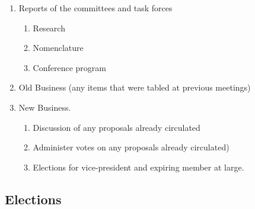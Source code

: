\begin{refsection}
\begin{enumerate}
\item Reports of the committees and task forces \newline
\begin{enumerate}
\item  Research \newline
\item  Nomenclature \newline
\item  Conference program \newline
\end{enumerate}
\item Old Business (any items that were tabled at previous meetings) \newline
\item  New Business. \newline
\begin{enumerate}
    \item  Discussion of any proposals already circulated \newline
    \item  Administer votes on any proposals already circulated) \newline
    \item  Elections for vice-president and expiring member at large. \newline
\end{enumerate}
\end{enumerate}



 

\newpage

\subsection{Elections}
\label{elections}


\end{refsection}
